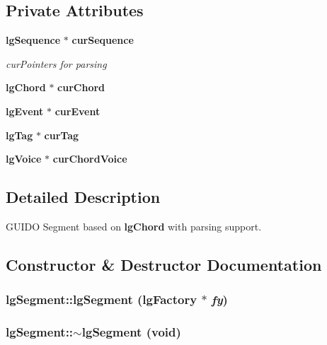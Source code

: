 \subsection*{Private Attributes}
\begin{CompactItemize}
\item 
{\bf lg\-Sequence} $\ast$ {\bf cur\-Sequence}
\begin{CompactList}\small\item\em cur\-Pointers for parsing \item\end{CompactList}\item 
{\bf lg\-Chord} $\ast$ {\bf cur\-Chord}
\item 
{\bf lg\-Event} $\ast$ {\bf cur\-Event}
\item 
{\bf lg\-Tag} $\ast$ {\bf cur\-Tag}
\item 
{\bf lg\-Voice} $\ast$ {\bf cur\-Chord\-Voice}
\end{CompactItemize}


\subsection{Detailed Description}
GUIDO Segment based on {\bf lg\-Chord} with parsing support. 



\subsection{Constructor \& Destructor Documentation}
\subsubsection{\setlength{\rightskip}{0pt plus 5cm}lg\-Segment::lg\-Segment ({\bf lg\-Factory} $\ast$ {\em fy})}\label{classlgSegment_a0}


\subsubsection{\setlength{\rightskip}{0pt plus 5cm}lg\-Segment::$\sim${\bf lg\-Segment} (void)\hspace{0.3cm}{\tt  [virtual]}}\label{classlgSegment_a5}




